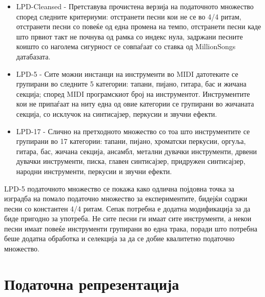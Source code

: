 \begin{itemize}
    \item LPD-Cleansed - Претставува прочистена верзија на податочното множество според следните критериуми: отстранети песни кои не се во 4/4 ритам, отстранети песни со повеќе од една промена на темпо, отстранети песни каде што првиот такт не почнува од рамка со индекс нула, задржани песните коишто со наголема сигурност се совпаѓаат со ставка од MillionSongs датабазата.
    \item LPD-5 - Сите можни инстанци на инструменти во MIDI датотеките се групирани во следните 5 категории: тапани, пијано, гитара, бас и жичана секција; според MIDI програмскиот број на инструментот. Инструментите кои не припаѓаат на ниту една од овие категории се групирани во жичаната секција, со исклучок на синтисајзер, перкусии и звучни ефекти.
    \item LPD-17 - Слично на претходното множество со тоа што инструментите се групирани во 17 категории: тапани, пијано, хроматски перкусии, оргуља, гитара, бас, жичана секција, ансамбл, метални дувачки инструменти, дрвени дувачки инструменти, писка, главен синтисајзер, придружен синтисајзер, народни инструменти, перкусии и звучни ефекти.
\end{itemize}

LPD-5 податочното множество се покажа како одлична појдовна точка за изградба на помало податочно множество за експериментите, бидејќи содржи песни со константен 4/4 ритам. Сепак потребна е додатна модификација за да биде пригодно за употреба. Не сите песни ги имаат сите инструменти, а некои песни имаат повеќе инструменти групирани во една трака, поради што потребна беше додатна обработка и селекција за да се добие квалитетно податочно множество.

\section{Податочна репрезентација}

